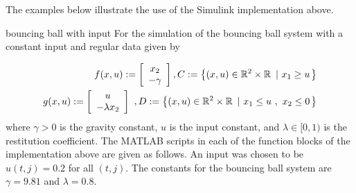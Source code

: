 The examples below illustrate the use of the Simulink implementation above.

\begin{example}{bouncing ball with input}
\label{ex:bbinput} For the simulation of the bouncing ball system  with a constant input and regular data given by

\begin{eqnarray}
f(x,u):=\left[
 \begin{array}{c}
   x_{2} \\
 -\gamma
 \end{array}
\right],
   C : = \left\{ (x,u) \in {\mathbb R}^{2}\times{\mathbb R}\ \left| \ x_{1} \geq u \right.\right\} \\
g(x,u):=\left[ \begin{array}{c}
 u \\
- \lambda x_{2}
\end{array}
\right]\ ,
    D: = \left\{ (x,u) \in {\mathbb R}^{2}\times{\mathbb R}\ \left| \ x_{1} \leq u \ , \
  x_{2} \leq 0 \right.\right\}
\end{eqnarray}
where $\gamma >0$ is the gravity constant, $u$ is the input constant,
and $\lambda \in [0,1)$ is the restitution coefficient.
The MATLAB scripts in each of the function blocks of the implementation above are given as follows.
An input was chosen to be $u(t,j) = 0.2$ for all $(t,j)$. The constants for the bouncing ball
system are $\gamma = 9.81$ and $\lambda=0.8$.

\bigskip


\end{example}
